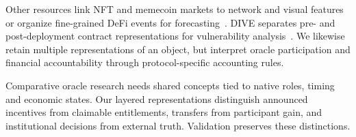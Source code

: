 Other resources link NFT and memecoin markets to network and visual features~\cite{nadini2021mapping,long2025coinmeme} or organize fine-grained DeFi events for forecasting~\cite{jia2026eventaware}. DIVE separates pre- and post-deployment contract representations for vulnerability analysis~\cite{alsunaidi2026dive}. We likewise retain multiple representations of an object, but interpret oracle participation and financial accountability through protocol-specific accounting rules.



Comparative oracle research needs shared concepts tied to native roles, timing and economic states. Our layered representations distinguish announced incentives from claimable entitlements, transfers from participant gain, and institutional decisions from external truth. Validation preserves these distinctions.
